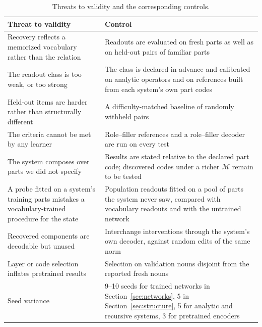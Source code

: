 \documentclass[10pt]{article}
\theoremstyle{plain}
\theoremstyle{remark}
\newcommand{\M}{\mathcal{M}}
\begin{document}
\begin{table}[h]
  \caption{Threats to validity and the corresponding controls.}
  \label{tab:controls}
  \centering\small
  \begin{tabularx}{\linewidth}{@{}YY@{}}
    \toprule
    Threat to validity & Control \\
    \midrule
    Recovery reflects a memorized vocabulary rather than the relation & Readouts are evaluated on fresh parts as well as on held-out pairs of familiar parts \\
    The readout class is too weak, or too strong & The class is declared in advance and calibrated on analytic operators and on references built from each system's own part codes \\
    Held-out items are harder rather than structurally different & A difficulty-matched baseline of randomly withheld pairs \\
    The criteria cannot be met by any learner & Role--filler references and a role--filler decoder are run on every test \\
    The system composes over parts we did not specify & Results are stated relative to the declared part code; discovered codes under a richer $\M$ remain to be tested \\
    A probe fitted on a system's training parts mistakes a vocabulary-trained procedure for the state & Population readouts fitted on a pool of parts the system never saw, compared with vocabulary readouts and with the untrained network \\
    Recovered components are decodable but unused & Interchange interventions through the system's own decoder, against random edits of the same norm \\
    Layer or code selection inflates pretrained results & Selection on validation nouns disjoint from the reported fresh nouns \\
    Seed variance & 9--10 seeds for trained networks in Section~\ref{sec:networks}, 5 in Section~\ref{sec:structure}, 5 for analytic and recursive systems, 3 for pretrained encoders \\
    \bottomrule
  \end{tabularx}
\end{table}
\end{document}
